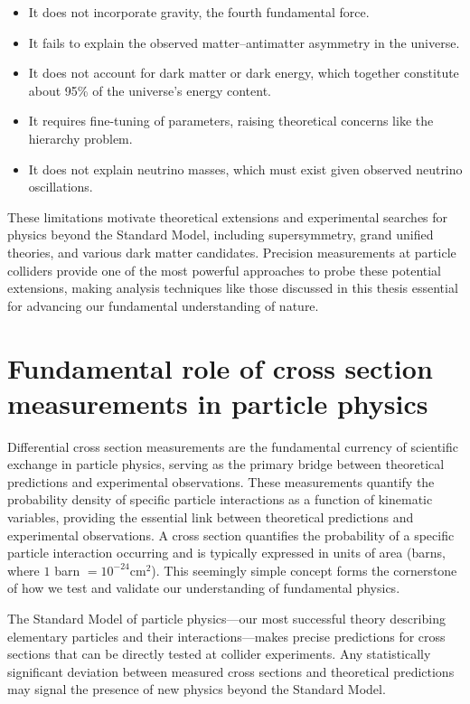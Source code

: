 \begin{itemize}
\item It does not incorporate gravity, the fourth fundamental force.
\item It fails to explain the observed matter--antimatter asymmetry in the universe.
\item It does not account for dark matter or dark energy, which together constitute about 95\% of the universe's energy content.
\item  It requires fine-tuning of parameters, raising theoretical concerns like the hierarchy problem.
\item  It does not explain neutrino masses, which must exist given observed neutrino oscillations.
\end{itemize}
These limitations motivate theoretical extensions and experimental searches for physics beyond the Standard Model, including supersymmetry, grand unified theories, and various dark matter candidates.
%
Precision measurements at particle colliders provide one of the most powerful approaches to probe these potential extensions, making analysis techniques like those discussed in this thesis essential for advancing our fundamental understanding of nature.

\section{Fundamental role of cross section measurements in particle physics}

Differential cross section measurements are the fundamental currency of scientific exchange in particle physics, serving as the primary bridge between theoretical predictions and experimental observations.
%
These measurements quantify the probability density of specific particle interactions as a function of kinematic variables, providing the essential link between theoretical predictions and experimental observations.
%
 A cross section quantifies the probability of a specific particle interaction occurring and is typically expressed in units of area (barns, where $1$ barn $= 10^{-24} \mathrm{cm}^2$). This seemingly simple concept forms the cornerstone of how we test and validate our understanding of fundamental physics.
 
The Standard Model of particle physics---our most successful theory describing elementary particles and their interactions---makes precise predictions for cross sections that can be directly tested at collider experiments.
%
Any statistically significant deviation between measured cross sections and theoretical predictions may signal the presence of new physics beyond the Standard Model.

